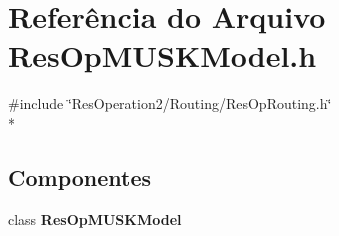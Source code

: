 \section{Referência do Arquivo Res\+Op\+M\+U\+S\+K\+Model.\+h}
\label{_res_op_m_u_s_k_model_8h}
{\ttfamily \#include \char`\"{}Res\+Operation2/\+Routing/\+Res\+Op\+Routing.\+h\char`\"{}}\\*
\subsection*{Componentes}
\begin{DoxyCompactItemize}
\item 
class {\bf Res\+Op\+M\+U\+S\+K\+Model}
\end{DoxyCompactItemize}
